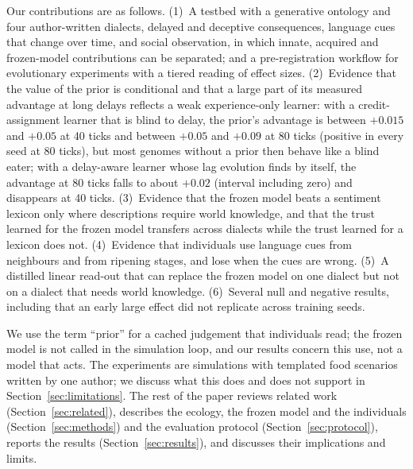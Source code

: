 Our contributions are as follows. (1)~A testbed with a generative ontology and four author-written dialects, delayed and deceptive consequences, language cues that change over time, and social observation, in which innate, acquired and frozen-model contributions can be separated; and a pre-registration workflow for evolutionary experiments with a tiered reading of effect sizes. (2)~Evidence that the value of the prior is conditional and that a large part of its measured advantage at long delays reflects a weak experience-only learner: with a credit-assignment learner that is blind to delay, the prior's advantage is between $+0.015$ and $+0.05$ at 40 ticks and between $+0.05$ and $+0.09$ at 80 ticks (positive in every seed at 80 ticks), but most genomes without a prior then behave like a blind eater; with a delay-aware learner whose lag evolution finds by itself, the advantage at 80 ticks falls to about $+0.02$ (interval including zero) and disappears at 40 ticks. (3)~Evidence that the frozen model beats a sentiment lexicon only where descriptions require world knowledge, and that the trust learned for the frozen model transfers across dialects while the trust learned for a lexicon does not. (4)~Evidence that individuals use language cues from neighbours and from ripening stages, and lose when the cues are wrong. (5)~A distilled linear read-out that can replace the frozen model on one dialect but not on a dialect that needs world knowledge. (6)~Several null and negative results, including that an early large effect did not replicate across training seeds.

We use the term ``prior'' for a cached judgement that individuals read; the frozen model is not called in the simulation loop, and our results concern this use, not a model that acts. The experiments are simulations with templated food scenarios written by one author; we discuss what this does and does not support in Section~\ref{sec:limitations}. The rest of the paper reviews related work (Section~\ref{sec:related}), describes the ecology, the frozen model and the individuals (Section~\ref{sec:methods}) and the evaluation protocol (Section~\ref{sec:protocol}), reports the results (Section~\ref{sec:results}), and discusses their implications and limits.
